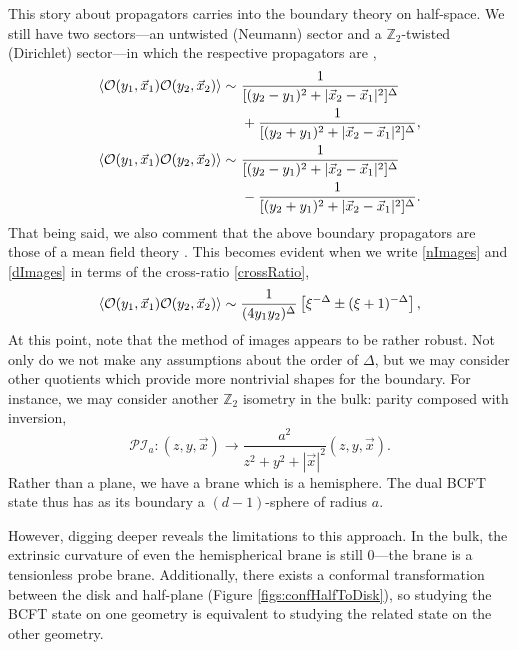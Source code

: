 \documentclass[reprint,amsmath,amssymb,aps,nofootinbib,twocolumn]{revtex4-2}
\begin{document}
\begin{appendix}
This story about propagators carries into the boundary theory on half-space. We still have two sectors---an untwisted (Neumann) sector and a $\mathbb{Z}_2$-twisted (Dirichlet) sector---in which the respective propagators are \cite{Almheiri:2018ijj},
\begin{align}
\begin{split}
\expval{\mathcal{O}(y_1,\vec{x}_1)\mathcal{O}(y_2,\vec{x}_2)} \sim\ &\frac{1}{[(y_2-y_1)^2 + |\vec{x}_2-\vec{x}_1|^2]^\Delta}\\
&+\frac{1}{[(y_2 + y_1)^2 + |\vec{x}_2-\vec{x}_1|^2]^\Delta},
\end{split}\label{nImages}\\
\begin{split}
\expval{\mathcal{O}(y_1,\vec{x}_1)\mathcal{O}(y_2,\vec{x}_2)} \sim\ &\frac{1}{[(y_2-y_1)^2 + |\vec{x}_2-\vec{x}_1|^2]^\Delta}\\
&-\frac{1}{[(y_2 + y_1)^2 + |\vec{x}_2-\vec{x}_1|^2]^\Delta}.
\end{split}\label{dImages}
\end{align}
That being said, we also comment that the above boundary propagators are those of a mean field theory \cite{Mazac:2018biw}. This becomes evident when we write \eqref{nImages} and \eqref{dImages} in terms of the cross-ratio \eqref{crossRatio},
\begin{equation}
\expval{\mathcal{O}(y_1,\vec{x}_1)\mathcal{O}(y_2,\vec{x}_2)} \sim \frac{1}{(4y_1 y_2)^\Delta} \left[\xi^{-\Delta} \pm (\xi + 1)^{-\Delta}\right],
\end{equation}
At this point, note that the method of images appears to be rather robust. Not only do we not make any assumptions about the order of $\Delta$, but we may consider other quotients which provide more nontrivial shapes for the boundary. For instance, we may consider another $\mathbb{Z}_2$ isometry in the bulk: parity composed with inversion,
\begin{equation}
\mathcal{P} \mathcal{I}_a: (z,y,\vec{x}) \to \frac{a^2}{z^2 + y^2 + |\vec{x}|^2}(z,y,\vec{x}).
\end{equation}
Rather than a plane, we have a brane which is a hemisphere. The dual BCFT state thus has as its boundary a $(d-1)$-sphere of radius $a$.

However, digging deeper reveals the limitations to this approach. In the bulk, the extrinsic curvature of even the hemispherical brane is still $0$---the brane is a tensionless probe brane. Additionally, there exists a conformal transformation between the disk and half-plane (Figure \ref{figs:confHalfToDisk}), so studying the BCFT state on one geometry is equivalent to studying the related state on the other geometry.


\end{appendix}
\end{document}
